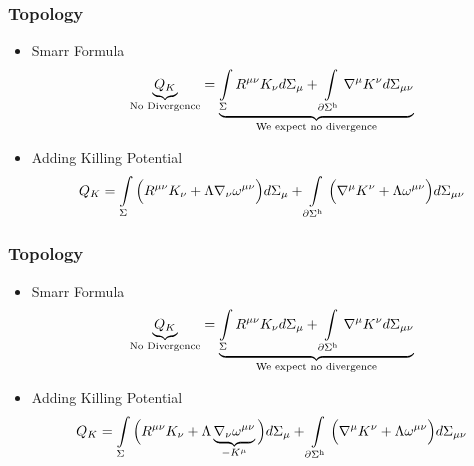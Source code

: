 \documentclass[t]{beamer}
\begin{document}
\begin{frame}
\frametitle{Topology}
\begin{itemize}
\setlength{\parskip}{10pt}
\item Smarr Formula
\begin{align}
\underbrace{Q_{K}}_{\text{No Divergence}} = \underbrace{\int\limits_{\Sigma} R^{\mu\nu} K_\nu d\Sigma_{\mu} + \int\limits_{\partial \Sigma^{\text{h}}} \nabla^{\mu} K^{\nu} d\Sigma_{\mu\nu}}_{\text{We expect no divergence}} \notag
\end{align}

\item Adding Killing Potential
\begin{align}
Q_{K} = \int\limits_{\Sigma} \Big( R^{\mu\nu} K_\nu + \Lambda \nabla_\nu \omega^{\mu\nu} \Big) d\Sigma_{\mu} + \int\limits_{\partial \Sigma^{\text{h}}} \Big( \nabla^{\mu} K^{\nu} + \Lambda \omega^{\mu\nu} \Big) d\Sigma_{\mu\nu} \notag
\end{align}
\end{itemize}

\end{frame}
\begin{frame}
\frametitle{Topology}
\begin{itemize}
\setlength{\parskip}{8pt}
\item Smarr Formula
\begin{align}
\underbrace{Q_{K}}_{\text{No Divergence}} = \underbrace{\int\limits_{\Sigma} R^{\mu\nu} K_\nu d\Sigma_{\mu} + \int\limits_{\partial \Sigma^{\text{h}}} \nabla^{\mu} K^{\nu} d\Sigma_{\mu\nu}}_{\text{We expect no divergence}} \notag
\end{align}

\item Adding Killing Potential
\begin{align}
Q_{K} = \int\limits_{\Sigma} \Big( R^{\mu\nu} K_\nu + \Lambda \underbrace{\nabla_\nu \omega^{\mu\nu}}_{-K^\mu} \Big) d\Sigma_{\mu} + \int\limits_{\partial \Sigma^{\text{h}}} \Big( \nabla^{\mu} K^{\nu} + \Lambda \omega^{\mu\nu} \Big) d\Sigma_{\mu\nu} \notag
\end{align}
\end{itemize}

\end{frame}
\end{document}
